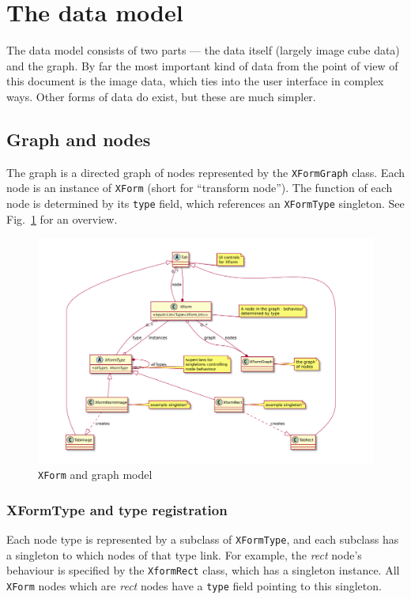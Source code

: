 

\section{The data model}
The data model consists of two parts --- the data itself (largely
image cube data) and the graph. By far the most important kind of data
from the point of view of this document is the image data, which ties
into the user interface in complex ways. Other forms of data do exist,
but these are much simpler.


\subsection{Graph and nodes}
The graph is a directed graph of nodes represented by the 
\texttt{XFormGraph} class. Each node is an instance of \texttt{XForm}
(short for ``transform node''). The function of each node is
determined by its \texttt{type} field, which references an
\texttt{XFormType} singleton. See Fig.~\ref{xform.pdf} for an overview.

\begin{figure}[ht]
\center
\includegraphics[width=6in]{xform.pdf}
\caption{\texttt{XForm} and graph model}
\label{xform.pdf}
\end{figure}

\subsubsection{XFormType and type registration}
\label{xformtype}
Each node type is represented by a subclass of \texttt{XFormType},
and each subclass has a singleton to which nodes of that type link.
For example, the \emph{rect} node's behaviour is specified by
the \texttt{XformRect} class, which has a singleton instance. All
\texttt{XForm} nodes which are \emph{rect} nodes have a \texttt{type} field
pointing to this singleton.

